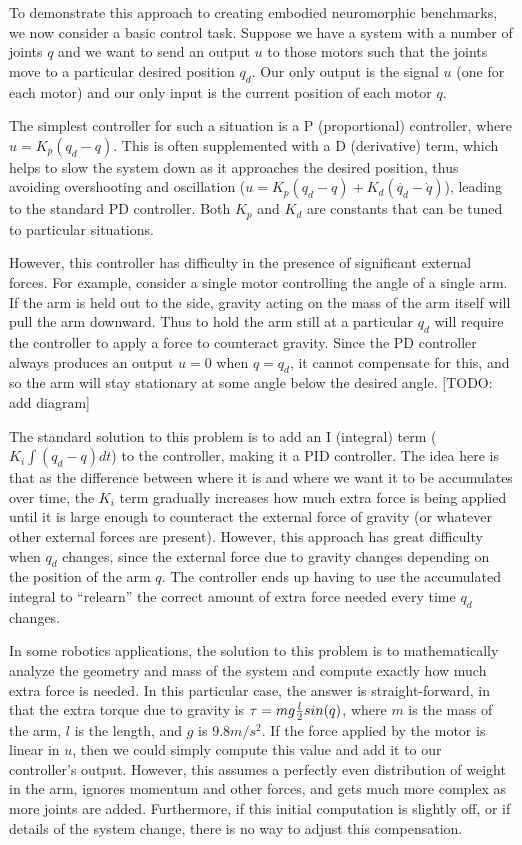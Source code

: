 \documentclass{frontiersSCNS} %
\begin{document}
To demonstrate this approach to creating embodied neuromorphic benchmarks,
we now consider a basic control task.  Suppose we have a system with a number
of joints $q$ and we want to send an output $u$ to those motors such that
the joints move to a particular desired position $q_d$.  Our only output is
the signal $u$ (one for each motor) and our only input is the current position
of each motor $q$.

The simplest controller for such a situation is a P (proportional) controller,
where $u=K_p(q_d - q)$.  This is often supplemented with a D (derivative) term,
which helps to slow the system down as it approaches the desired position,
thus avoiding overshooting and oscillation ($u=K_p(q_d - q) + K_d(\dot{q_d} - \dot{q})$),
leading to the standard PD controller.  Both $K_p$ and $K_d$ are constants that can be
tuned to particular situations.

However, this controller has difficulty in the presence of significant external
forces.  For example, consider a single motor controlling the angle of a single
arm.  If the arm is held out to the side, gravity acting on the mass of the
arm itself will pull the arm downward.  Thus to hold the arm still at a
particular $q_d$ will require the controller to apply a force to counteract
gravity.  Since the PD controller always produces an output $u=0$ when $q=q_d$,
it cannot compensate for this, and so the arm will stay stationary at some
angle below the desired angle. [TODO: add diagram]

The standard solution to this problem is to add an I (integral) term ($K_i \int{(q_d-q) dt}$)
to the controller, making it a PID controller.  The idea here is that as the difference between where it is and
where we want it to be accumulates over time, the $K_i$ term gradually increases
how much extra force is being applied until it is large enough to counteract
the external force of gravity (or whatever other external forces are present).
However, this approach has great difficulty when $q_d$ changes, since the
external force due to gravity changes depending on the position of the arm $q$.
The controller ends up having to use the accumulated integral to ``relearn'' the
correct amount of extra force needed every time $q_d$ changes.

In some robotics applications, the solution to this problem is to mathematically
analyze the geometry and mass of the system and compute exactly how much extra
force is needed.  In this particular case, the answer is straight-forward,
in that the extra torque due to gravity is $\tau=mg {l \over 2} sin(q)$, where
$m$ is the mass of the arm, $l$ is the length, and $g$ is $9.8m/s^2$.  If the
force applied by the motor is linear in $u$, then we could simply compute this
value and add it to our controller's output.  However, this assumes a perfectly
even distribution of weight in the arm, ignores momentum and other forces, and 
gets much more complex as more joints are added.  Furthermore, if this
initial computation is slightly off, or if details of the system change,
there is no way to adjust this compensation.
\end{document}
